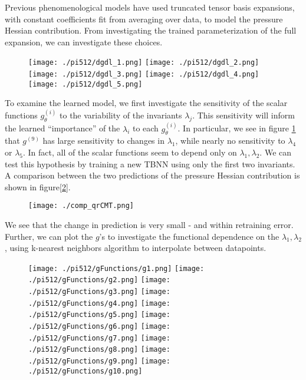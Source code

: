 Previous phenomenological models have used truncated tensor basis expansions, with constant coefficients fit from averaging over data, to model the pressure Hessian contribution. From investigating the trained parameterization of the full expansion, we can investigate these choices.

\begin{figure}
  \centering
  \texttt{[image: ./pi512/dgdl\_1.png]}%
  \texttt{[image: ./pi512/dgdl\_2.png]}
  \texttt{[image: ./pi512/dgdl\_3.png]}%
  \texttt{[image: ./pi512/dgdl\_4.png]}
  \texttt{[image: ./pi512/dgdl\_5.png]}
  \caption{ }
  \label{fig:sensitivityGs}
\end{figure}

To examine the learned model, we first investigate the sensitivity of the scalar functions $g_\theta^{(i)}$ to the variability of the invariants $\lambda_j$. This sensitivity will inform the learned ``importance'' of the $\lambda_i$ to each $g_\theta^{(i)}$. In particular, we see in figure \ref{fig:sensitivityGs} that $g^{(9)}$ has large sensitivity to changes in $\lambda_1$, while nearly no sensitivity to $\lambda_4$ or $\lambda_5$. In fact, all of the scalar functions seem to depend only on $\lambda_1, \lambda_2$. We can test this hypothesis by training a new TBNN using only the first two invariants. A comparison between the two predictions of the pressure Hessian contribution is shown in figure[\ref{fig:qrCMTComp}].

\begin{figure}
  \centering
  \texttt{[image: ./comp\_qrCMT.png]}
  \caption{ }
  \label{fig:qrCMTComp}
\end{figure}

We see that the change in prediction is very small - and within retraining error. Further, we can plot the $g$'s to investigate the functional dependence on the $\lambda_1,\lambda_2$, using k-nearest neighbors algorithm to interpolate between datapoints.

\begin{figure}
  \centering
  \texttt{[image: ./pi512/gFunctions/g1.png]}%
  \texttt{[image: ./pi512/gFunctions/g2.png]}%
  \texttt{[image: ./pi512/gFunctions/g3.png]}
  \texttt{[image: ./pi512/gFunctions/g4.png]}%
  \texttt{[image: ./pi512/gFunctions/g5.png]}%
  \texttt{[image: ./pi512/gFunctions/g6.png]}
  \texttt{[image: ./pi512/gFunctions/g7.png]}%
  \texttt{[image: ./pi512/gFunctions/g8.png]}%
  \texttt{[image: ./pi512/gFunctions/g9.png]}
  \texttt{[image: ./pi512/gFunctions/g10.png]}%
  \caption{ }
  \label{fig:gFunctions}
\end{figure}
